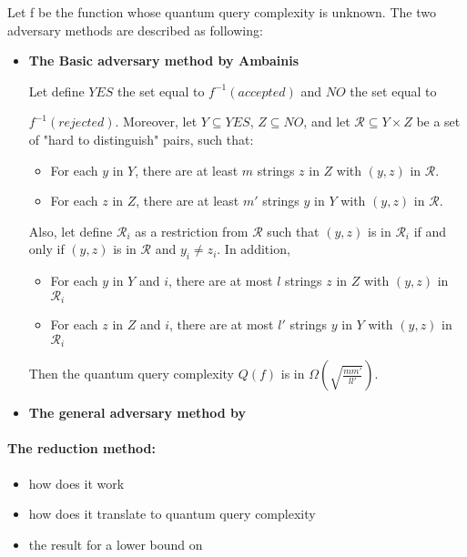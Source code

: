 Let f be the function whose quantum query complexity is unknown. The two adversary methods
are described as following:
\begin{itemize}
    \item \textbf{The Basic adversary method by Ambainis \cite{andris_adversary_methode}}
          \begin{theorem}
              Let define $YES$ the set equal to $f^{-1}(accepted)$ and $NO$ the set
              equal to

              $f^{-1}(rejected)$. Moreover, let $Y\subseteq YES$, $Z \subseteq NO$, and
              let $\mathcal{R} \subseteq Y\times Z$ be a set of "hard to distinguish" pairs, such that:
              \begin{itemize}
                  \item For each $y$ in $Y$, there are at least $m$ strings $z$ in $Z$ with $(y,z)$ in $\mathcal{R}$.
                  \item For each $z$ in $Z$, there are at least $m'$ strings $y$ in $Y$ with $(y,z)$ in $\mathcal{R}$.
              \end{itemize}
              Also, let define $\mathcal{R}_i$ as a restriction from $\mathcal{R}$ such
              that $(y, z)$ is in $\mathcal{R}_i$ if and only if $(y, z)$ is in $\mathcal{R}$
              and $y_i \neq z_i$.
              In addition,
              \begin{itemize}
                  \item For each $y$ in $Y$ and $i$, there are at most $l$ strings $z$ in $Z$ with $(y,z)$ in $\mathcal{R}_i$
                  \item For each $z$ in $Z$ and $i$, there are at most $l'$ strings $y$ in $Y$ with $(y,z)$ in $\mathcal{R}_i$
              \end{itemize}
              Then the quantum query complexity $Q(f)$ is in  $\Omega(\sqrt{\frac{m m'}{ll'}})$.
          \end{theorem}
    \item \textbf{The general adversary method by \cite{}}
\end{itemize}

\paragraph*{\textbf{The reduction method:}}
\begin{itemize}
    \item how does it work
    \item how does it translate to quantum query complexity
    \item the result for a lower bound on 
\end{itemize}


